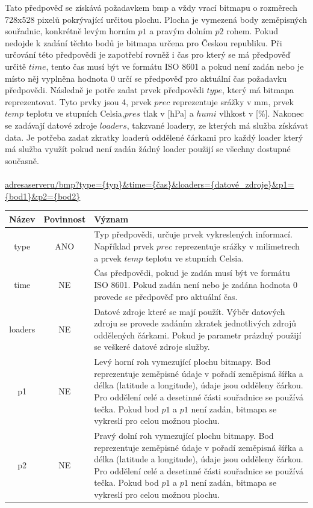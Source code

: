 \documentclass[czech,bachelor,dept460,male,csharp,cpdeclaration]{diploma}
\begin{document}
	Tato předpověď se získává požadavkem bmp a vždy vrací bitmapu o rozměrech 728x528 pixelů pokrývající určitou plochu. Plocha je vymezená body zeměpisných souřadnic, konkrétně levým horním $p1$ a pravým dolním $p2$ rohem. Pokud nedojde k zadání těchto bodů je bitmapa určena pro Českou republiku. Při určování této předpovědi je zapotřebí rovněž i čas pro který se má předpověď určitě $time$, tento čas musí být ve formátu ISO 8601 a pokud není zadán nebo je místo něj vyplněna hodnota 0 určí se předpověď pro aktuální čas požadavku předpovědi. Následně je potře zadat prvek předpovědi $type$, který má bitmapa reprezentovat. Tyto prvky jsou 4, prvek $prec$ reprezentuje srážky v mm, prvek $temp$ teplotu ve stupních Celsia,$pres$ tlak v [hPa] a $humi$ vlhkost v [\%]. Nakonec se zadávají datové zdroje $loaders$, takzvané loadery, ze kterých má služba získávat data. Je potřeba zadat zkratky loaderů oddělené čárkami pro každý loader který má služba využít pokud není zadán žádný loader použijí se všechny dostupné současně.
	\\\\
	\url{adresaserveru/bmp?type={typ}\&time={čas}\&loaders={datové\_zdroje}\&p1={bod1}\&p2={bod2}}
	
	\begin{center}
		
		
		\begin{tabular}{c c p{13cm}}
			Název & Povinnost & Význam \\
			\midrule
			type & ANO & Typ předpovědi, určuje prvek vykreslených informací. Například prvek $prec$ reprezentuje srážky v milimetrech a prvek $temp$ teplotu ve stupních Celsia.\\ 
			time & NE & Čas předpovědi, pokud je zadán musí být ve formátu ISO 8601. Pokud zadán není nebo je zadána hodnota 0  provede se předpověď pro aktuální čas.\\ 
			loaders & NE & Datové zdroje které se mají použít. Výběr datových zdroju se provede zadáním zkratek jednotlivých zdrojů oddělených čárkami. Pokud je parametr prázdný použijí se veškeré datové zdroje služby. \\ 
			p1 & NE & Levý horní roh vymezující plochu bitmapy. Bod reprezentuje zeměpisné údaje v pořadí zeměpisná šířka a délka (latitude a longitude), údaje jsou odděleny čárkou. Pro oddělení celé a desetinné části souřadnice se používá tečka. Pokud bod $p1$ a $p1$ není zadán, bitmapa se vykreslí pro celou možnou plochu.\\
			p2 & NE & Pravý dolní roh vymezující plochu bitmapy. Bod reprezentuje zeměpisné údaje v pořadí zeměpisná šířka a délka (latitude a longitude), údaje jsou odděleny čárkou. Pro oddělení celé a desetinné části souřadnice se používá tečka. Pokud bod $p1$ a $p1$ není zadán, bitmapa se vykreslí pro celou možnou plochu.\\
		\end{tabular}
	\end{center}
	
\end{document}
